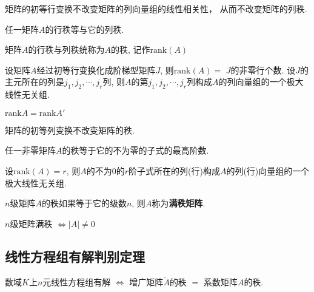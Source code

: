 \begin{Theorem}
矩阵的初等行变换不改变矩阵的列向量组的线性相关性， 从而不改变矩阵的列秩.
\end{Theorem}

\begin{Theorem}
任一矩阵$A$的行秩等与它的列秩.
\end{Theorem}

\begin{Definition}
矩阵$A$的行秩与列秩统称为$A$的秩, 记作$\text{rank}(A)$
\end{Definition}

\begin{Corollary}
设矩阵$A$经过初等行变换化成阶梯型矩阵$J$, 则$\text{rank}(A) =$ $J$的非零行个数. 设$J$的主元所在的列是$j_1, j_2, \cdots, j_r$列, 则$A$的第$j_1, j_2, \cdots, j_r$列构成$A$的列向量组的一个极大线性无关组.
\end{Corollary}

\begin{Corollary}
$\text{rank} A = \text{rank} A' $
\end{Corollary}

\begin{Corollary}
矩阵的初等列变换不改变矩阵的秩.
\end{Corollary}

\begin{Theorem}
任一非零矩阵$A$的秩等于它的不为零的子式的最高阶数.
\end{Theorem}

\begin{Corollary}
设$\text{rank}(A) = r$, 则$A$的不为$0$的$r$阶子式所在的列(行)构成$A$的列(行)向量组的一个极大线性无关组.
\end{Corollary}

\begin{Definition}[满秩矩阵]
$n$级矩阵$A$的秩如果等于它的级数$n$, 则$A$称为\textbf{满秩矩阵}.
\end{Definition}

\begin{Corollary}
$n$级矩阵满秩 $\Leftrightarrow |A| \neq 0$
\end{Corollary}

\subsection{线性方程组有解判别定理}

\begin{Theorem}
数域$K$上$n$元线性方程组有解 $\iff$ 增广矩阵$\tilde{A}$的秩 $=$ 系数矩阵$A$的秩.
\end{Theorem}

